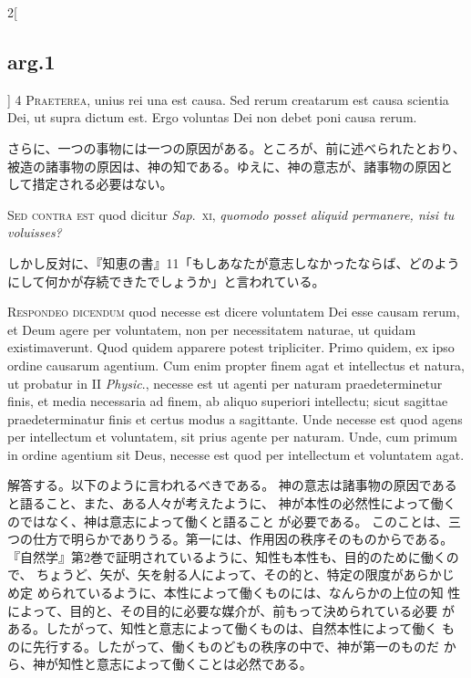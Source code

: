 \documentclass[paper=a4paper,fontsize=10pt,jafontsize=9pt,titlepage]{jlreq}
\begin{document}
\begin{paracol}{2}[\subsection{arg.1}]
{\scshape 4 Praeterea}, unius rei una est causa. Sed
 rerum creatarum est causa scientia Dei, ut supra dictum est. Ergo
 voluntas Dei non debet poni causa rerum.

\switchcolumn

さらに、一つの事物には一つの原因がある。ところが、前に述べられたとおり、
 被造の諸事物の原因は、神の知である。ゆえに、神の意志が、諸事物の原因と
 して措定される必要はない。

\switchcolumn*[\subsection{s.c.}]


{\scshape  Sed contra est} quod dicitur {\itshape Sap}.~{\scshape xi}, {\itshape quomodo
 posset aliquid permanere, nisi tu voluisses?}

\switchcolumn

しかし反対に、『知恵の書』11「もしあなたが意志しなかったならば、どのよう
 にして何かが存続できたでしょうか」と言われている。



{\scshape Respondeo dicendum} quod necesse est dicere
 voluntatem Dei esse causam rerum, et Deum agere per voluntatem, non per
 necessitatem naturae, ut quidam existimaverunt. Quod quidem apparere
 potest tripliciter. Primo quidem, ex ipso ordine causarum agentium. Cum
 enim propter finem agat et intellectus et natura, ut probatur in II
{\itshape  Physic}., necesse est ut agenti per naturam praedeterminetur finis, et
 media necessaria ad finem, ab aliquo superiori intellectu; sicut
 sagittae praedeterminatur finis et certus modus a sagittante. Unde
 necesse est quod agens per intellectum et voluntatem, sit prius agente
 per naturam. Unde, cum primum in ordine agentium sit Deus, necesse est
 quod per intellectum et voluntatem agat.

\switchcolumn

解答する。以下のように言われるべきである。
 神の意志は諸事物の原因であると語ること、また、ある人々が考えたように、
 神が本性の必然性によって働くのではなく、神は意志によって働くと語ること
 が必要である。
このことは、三つの仕方で明らかでありうる。第一には、作用因の秩序そのものからである。
 『自然学』第2巻で証明されているように、知性も本性も、目的のために働くので、
 ちょうど、矢が、矢を射る人によって、その的と、特定の限度があらかじめ定
 められているように、本性によって働くものには、なんらかの上位の知
 性によって、目的と、その目的に必要な媒介が、前もって決められている必要
 がある。したがって、知性と意志によって働くものは、自然本性によって働く
 ものに先行する。したがって、働くものどもの秩序の中で、神が第一のものだ
 から、神が知性と意志によって働くことは必然である。


\end{paracol}
\end{document}
